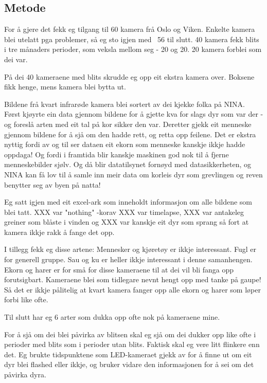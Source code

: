 \subsection{Metode}

For å gjere det fekk eg tilgang til 60 kamera frå Oslo og Viken. Enkelte kamera blei utelatt pga problemer, så eg sto igjen med ~56 til slutt.
40 kamera fekk blits i tre månaders perioder, som veksla mellom seg - 20 og 20. 20 kamera forblei som dei var.

På dei 40 kameraene med blits skrudde eg opp eit ekstra kamera over. Boksene fikk henge, mens kamera blei bytta ut.


Bildene frå kvart infrarøde kamera blei sortert av dei kjekke folka på NINA. Først kjøyrte ein data gjennom bildene for å gjette kva for slags dyr som var der - og foreslå arten med eit tal på kor sikker den var. Deretter gjekk eit menneske gjennom bildene for å sjå om den hadde rett, og retta opp feilene.
Det er ekstra nyttig fordi av og til ser dataen eit ekorn som menneske kanskje ikkje hadde oppdaga!
Og fordi i framtida blir kanskje maskinen god nok til å fjerne menneskebilder sjølv. Og då blir datatilsynet fornøyd med datasikkerheten, og NINA kan få lov til å samle inn meir data om korleis dyr som grevlingen og reven benytter seg av byen på natta!


Eg satt igjen med eit excel-ark som inneholdt informasjon om alle bildene som blei tatt. XXX var "nothing" -korav XXX var timelapse, XXX var antakeleg greiner som blåste i vinden og XXX var kanskje eit dyr som sprang så fort at kamera ikkje rakk å fange det opp.

I tillegg fekk eg disse artene: Mennesker og kjøretøy er ikkje interessant. Fugl er for generell gruppe. Sau og ku er heller ikkje interessant i denne samanhengen. Ekorn og harer er for små for disse kameraene til at dei vil bli fanga opp forutsigbart. Kameraene blei som tidlegare nevnt hengt opp med tanke på gaupe! Så det er ikkje pålitelig at kvart kamera fanger opp alle ekorn og harer som løper forbi like ofte.

Til slutt har eg 6 arter som dukka opp ofte nok på kameraene mine.


For å sjå om dei blei påvirka av blitsen skal eg sjå om dei dukker opp like ofte i perioder med blits som i perioder utan blits. Faktisk skal eg vere litt flinkere enn det. Eg brukte tidspunktene som LED-kameraet gjekk av for å finne ut om eit dyr blei flashed eller ikkje, og bruker vidare den informasjonen for å sei om det påvirka dyra.


